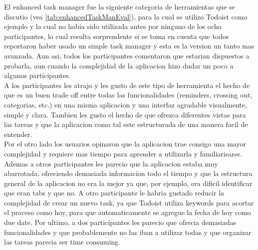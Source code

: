 El enhanced task manager fue la siguiente categoria de herramientas que se discutio (vea \ref{tab:enhancedTaskManEval}), para la cual se utilizo Todoist como ejemplo y la cual no habia sido utilizada antes por ninguno de los ocho participantes, lo cual resulta sorprendente si se toma en cuenta que todos reportaron haber usado un simple task manager y esta es la version un tanto mas avanzada. Aun asi, todos los participantes comentaron que estarian dispuestos a probarla, aun cuando la complejidad de la aplicacion hizo dudar un poco a algunos participantes.\\
A los participantes les atrajo y les gusto de este tipo de herramienta el hecho de que es un buen trade off entre todas las funcionalidades (reminders, crossing out, categorias, etc.) en una misma aplicacion y una interfaz agradable visualmente, simple y clara. Tambien les gusto el hecho de que ofrezca diferentes vistas para las tareas y que la aplicacion como tal este estructurada de una manera facil de entender.\\
Por el otro lado los usuarios opinaron que la aplicacion trae consigo una mayor complejidad y requiere mas tiempo para aprender a utilizarla y familiarisarse. Ademas a otros participantes les parecio que la aplicacion estaba muy abarrotada, ofreciendo demasiada informacion todo el tiempo y que la estructura general de la aplicacion no era la mejor ya que, por ejemplo, era dificil identificar que eran tabs y que no. A otro participante le habria gustado reducir la complejidad de crear un nuevo task, ya que Todoist utiliza keywords para acortar el proceso como hoy, para que automaticamente se agregue la fecha de hoy como due date. Por ultimo, a dos participantes les parecio que ofrecia demasiadas funcionalidades y que probablemente no las iban a utilizar todas y que organizar las tareas parecia ser time consuming.

